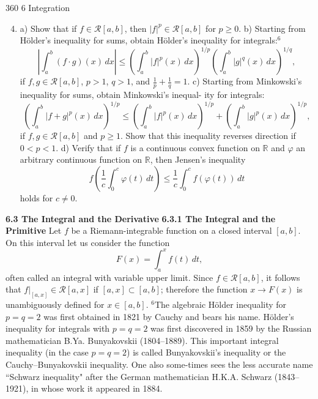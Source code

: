 360
6 Integration
\medskip
\begin{enumerate}
    \setcounter{enumi}{3}
    \item a) Show that if $f \in \mathcal{R}[a, b]$, then $| f |^p \in \mathcal{R}[a, b]$ for $p \ge 0$.
    \medskip
    b) Starting from Hölder's inequality for sums, obtain Hölder's inequality for
    integrals:$^6$
    \[
    \left| \int_a^b (f \cdot g)(x)\,dx \right| \le \left( \int_a^b |f|^p(x)\,dx \right)^{1/p} \left( \int_a^b |g|^q(x)\,dx \right)^{1/q},
    \]
    if $f, g \in \mathcal{R}[a, b]$, $p > 1$, $q > 1$, and $\frac{1}{p} + \frac{1}{q} = 1$.
    \medskip
    c) Starting from Minkowski's inequality for sums, obtain Minkowski's inequal-
    ity for integrals:
    \[
    \left( \int_a^b |f + g|^p(x)\,dx \right)^{1/p} \le \left( \int_a^b |f|^p(x)\,dx \right)^{1/p} + \left( \int_a^b |g|^p(x)\,dx \right)^{1/p},
    \]
    if $f, g \in \mathcal{R}[a, b]$ and $p \ge 1$. Show that this inequality reverses direction if $0 <
    p < 1$.
    \medskip
    d) Verify that if $f$ is a continuous convex function on $\mathbb{R}$ and $\varphi$ an arbitrary
    continuous function on $\mathbb{R}$, then Jensen's inequality
    \[
    f\left(\frac{1}{c}\int_0^c \varphi(t)\,dt\right) \le \frac{1}{c}\int_0^c f(\varphi(t))\,dt
    \]
    holds for $c\neq 0$.
\end{enumerate}
\medskip
\noindent \textbf{6.3 The Integral and the Derivative}
\medskip
\noindent \textbf{6.3.1 The Integral and the Primitive}
\medskip
Let $f$ be a Riemann-integrable function on a closed interval $[a, b]$. On this interval
let us consider the function
\[
F(x) = \int_a^x f(t)\,dt,
\tag{6.40}
\]
often called an integral with variable upper limit.
\medskip
Since $f \in \mathcal{R}[a, b]$, it follows that $f|_{[a,x]} \in \mathcal{R}[a, x]$ if $[a,x] \subset [a, b]$; therefore
the function $x \to F(x)$ is unambiguously defined for $x \in [a, b]$.
\medskip
\noindent $^6$The algebraic Hölder inequality for $p = q = 2$ was first obtained in 1821 by Cauchy and bears his
name. Hölder's inequality for integrals with $p = q = 2$ was first discovered in 1859 by the Russian
mathematician B.Ya. Bunyakovskii (1804–1889). This important integral inequality (in the case
$p = q = 2$) is called Bunyakovskii's inequality or the Cauchy–Bunyakovskii inequality. One also
some-times sees the less accurate name “Schwarz inequality" after the German mathematician
H.K.A. Schwarz (1843–1921), in whose work it appeared in 1884.